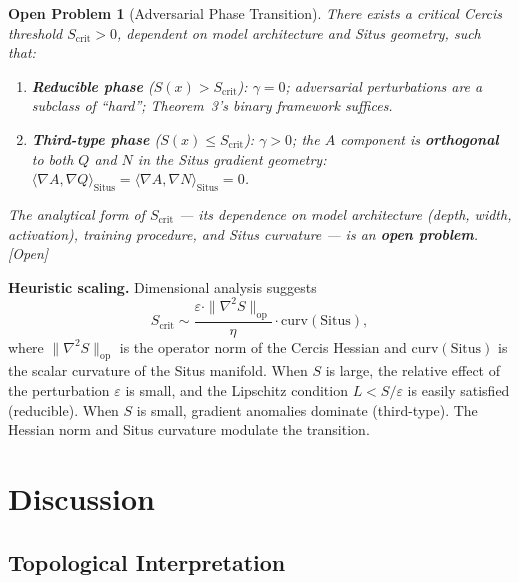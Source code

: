\documentclass[12pt,a4paper]{article}
\newtheorem{openproblem}[theorem]{Open Problem}
\newcommand{\openquest}{\textcolor{red!70!black}{\small\textsf{[Open]}}}
\newcommand{\Situs}{\mathrm{Situs}}
\begin{document}
\begin{openproblem}[Adversarial Phase Transition]
\label{conj:phase}
There exists a critical Cercis threshold $S_{\mathrm{crit}} > 0$, dependent
on model architecture and Situs geometry, such that:
\begin{enumerate}[label=(\roman*)]
    \item \textbf{Reducible phase} ($S(x) > S_{\mathrm{crit}}$):
          $\gamma = 0$; adversarial perturbations are a subclass of ``hard'';
          Theorem~3's binary framework suffices.
    \item \textbf{Third-type phase} ($S(x) \leq S_{\mathrm{crit}}$):
          $\gamma > 0$; the $A$ component is \textbf{orthogonal} to both
          $Q$ and $N$ in the Situs gradient geometry:
          $\langle \nabla A, \nabla Q \rangle_{\Situs} =
           \langle \nabla A, \nabla N \rangle_{\Situs} = 0$.
\end{enumerate}
The analytical form of $S_{\mathrm{crit}}$ — its dependence on model
architecture (depth, width, activation), training procedure, and Situs
curvature — is an \textbf{open problem}.  \openquest
\end{openproblem}

\medskip\noindent
\textbf{Heuristic scaling.}
Dimensional analysis suggests
\begin{equation}\label{eq:Scrit-heuristic}
    S_{\mathrm{crit}} \sim
    \frac{\varepsilon \cdot \|\nabla^2 S\|_{\mathrm{op}}}{\eta}
    \cdot \mathrm{curv}(\Situs),
\end{equation}
where $\|\nabla^2 S\|_{\mathrm{op}}$ is the operator norm of the Cercis
Hessian and $\mathrm{curv}(\Situs)$ is the scalar curvature of the Situs
manifold.  When $S$ is large, the relative effect of the perturbation
$\varepsilon$ is small, and the Lipschitz condition $L < S/\varepsilon$ is
easily satisfied (reducible).  When $S$ is small, gradient anomalies dominate
(third-type).  The Hessian norm and Situs curvature modulate the transition.

\section{Discussion}

\subsection{Topological Interpretation}
\end{document}
